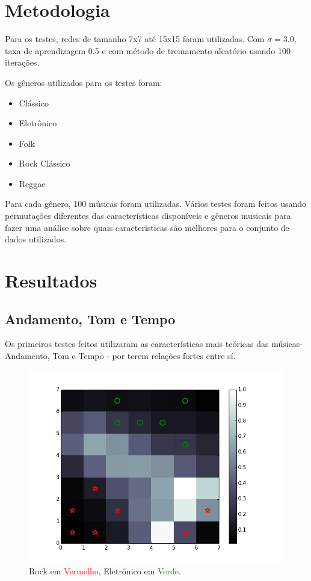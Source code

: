 \documentclass[journal]{IEEEtran}
\begin{document}
\section{Metodologia}
Para os testes, redes de tamanho 7x7 até 15x15 foram utilizadas. Com $\sigma=3.0$, taxa de aprendizagem 0.5 e com método de treinamento aleatório usando 100 iterações.

Os gêneros utilizados para os testes foram:
\begin{itemize}
	\item Clássico
	\item Eletrônico
	\item Folk
	\item Rock Clássico
	\item Reggae
\end{itemize}

Para cada gênero, 100 músicas foram utilizadas. Vários testes foram feitos usando permutações diferentes das características disponíveis e gêneros musicais para fazer uma análise sobre quais caracteristicas são melhores para o conjunto de dados utilizados.

\section{Resultados}
\subsection{Andamento, Tom e Tempo}
Os primeiros testes feitos utilizaram as características mais teóricas das músicas- Andamento, Tom e Tempo - por terem relações fortes entre sí.

\begin{figure}[H]
\centering
\includegraphics[scale=0.5]{images/key_tempo_rock_eletronic.png}
\caption{Rock em \textcolor{red}{Vermelho}, Eletrônico em \textcolor{green}{Verde}.}\label{key_tempo_rock_eletronic}
\end{figure}
\end{document}
